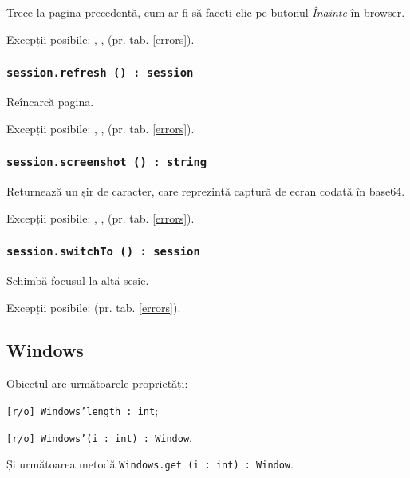 Trece la pagina precedentă, cum ar fi să faceți clic pe butonul \textit{Înainte} în browser.

Excepții posibile: , ,  (pr. tab. \ref{errors}).

\subsubsection{\texttt{session.refresh () : session}}

Reîncarcă pagina.

Excepții posibile: , ,  (pr. tab. \ref{errors}).

\subsubsection{\texttt{session.screenshot () : string}}

Returnează un șir de caracter, care reprezintă captură de ecran codată în base64.

Excepții posibile: , ,  (pr. tab. \ref{errors}).

\subsubsection{\texttt{session.switchTo () : session}}

Schimbă focusul la altă sesie.

Excepții posibile:  (pr. tab. \ref{errors}).


\subsection{{\color{orange} Windows}}

Obiectul \windows{} are următoarele proprietăți:
\begin{icItems}
	\item \texttt{[r/o] Windows'length : int};
	\item \texttt{[r/o] Windows'(i : int) : Window}.
\end{icItems}

Și următoarea metodă \texttt{Windows.get (i : int) : Window}.

